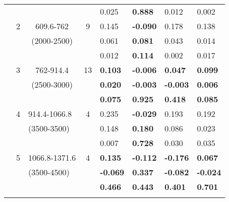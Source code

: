 \begin{table}[p]
\begin{tabular}{ccccllll}
 \multicolumn{1}{c}{} &  \multicolumn{1}{c}{} &  \multicolumn{1}{c}{} &  \multicolumn{1}{c}{} &0.025 & \textbf{0.888 } & 0.012  & 0.002  \\ \cline{5-8}\noalign{\smallskip}
 \multicolumn{1}{c}{} &  \multicolumn{1}{c}{2} &  \multicolumn{1}{p{2cm}}{609.6-762} &  \multicolumn{1}{c}{9} & 0.145 & \textbf{-0.090 } & 0.178  & 0.138  \\ 
 \multicolumn{1}{c}{} &  \multicolumn{1}{c}{} &  \multicolumn{1}{p{2cm}}{(2000-2500)} &  \multicolumn{1}{c}{} & 0.061 & \textbf{0.081 } & 0.043  & 0.014  \\ 
 \multicolumn{1}{c}{} &  \multicolumn{1}{c}{} &  \multicolumn{1}{c}{} &  \multicolumn{1}{c}{} & 0.012 &  \textbf{0.114 } & 0.002  & 0.017  \\ \cline{5-8}\noalign{\smallskip}
 \multicolumn{1}{c}{} &  \multicolumn{1}{c}{3} &  \multicolumn{1}{p{2cm}}{762-914.4} &  \multicolumn{1}{c}{13} & \textbf{0.103} &  \textbf{-0.006 } & \textbf{0.047 } & \textbf{0.099 } \\ 
 \multicolumn{1}{c}{} &  \multicolumn{1}{c}{} &  \multicolumn{1}{p{2cm}}{(2500-3000)} &  \multicolumn{1}{c}{} & \textbf{0.020} & \textbf{-0.003 } & \textbf{-0.003 } & \textbf{0.006 }  \\ 
 \multicolumn{1}{c}{} &  \multicolumn{1}{c}{} &  \multicolumn{1}{c}{} &  \multicolumn{1}{c}{} & \textbf{0.075} & \textbf{0.925 } & \textbf{0.418 } & \textbf{0.085 }  \\ \cline{5-8}\noalign{\smallskip}
 \multicolumn{1}{c}{} &  \multicolumn{1}{c}{4} &  \multicolumn{1}{l}{914.4-1066.8} &  \multicolumn{1}{c}{4} & 0.235 &  \textbf{-0.029 } & 0.193  & 0.192  \\ 
 \multicolumn{1}{c}{} &  \multicolumn{1}{c}{} &  \multicolumn{1}{l}{(3500-3500)} &  \multicolumn{1}{c}{} & 0.148 & \textbf{0.180 } & 0.086  & 0.023  \\ 
 \multicolumn{1}{c}{} &  \multicolumn{1}{c}{} &  \multicolumn{1}{c}{} &  \multicolumn{1}{c}{} & 0.007 & \textbf{0.728 } & 0.030  & 0.035  \\ \cline{5-8}\noalign{\smallskip}
 \multicolumn{1}{c}{} &  \multicolumn{1}{c}{5} &  \multicolumn{1}{l}{1066.8-1371.6} &  \multicolumn{1}{c}{4}& \textbf{0.135} & \textbf{-0.112 } & \textbf{-0.176 } & \textbf{0.067 }  \\ 
 \multicolumn{1}{c}{} &  \multicolumn{1}{c}{} &  \multicolumn{1}{l}{(3500-4500)} &  \multicolumn{1}{c}{} & \textbf{-0.069} &\textbf{0.337 } & \textbf{-0.082 } & \textbf{-0.024 }  \\ 
 \multicolumn{1}{c}{} &  \multicolumn{1}{c}{} &  \multicolumn{1}{c}{} &  \multicolumn{1}{c}{} & \textbf{0.466} & \textbf{0.443 } & \textbf{0.401 } & \textbf{0.701 }  \\ \cline{5-8}\noalign{\smallskip}

\end{tabular}
\end{table}

